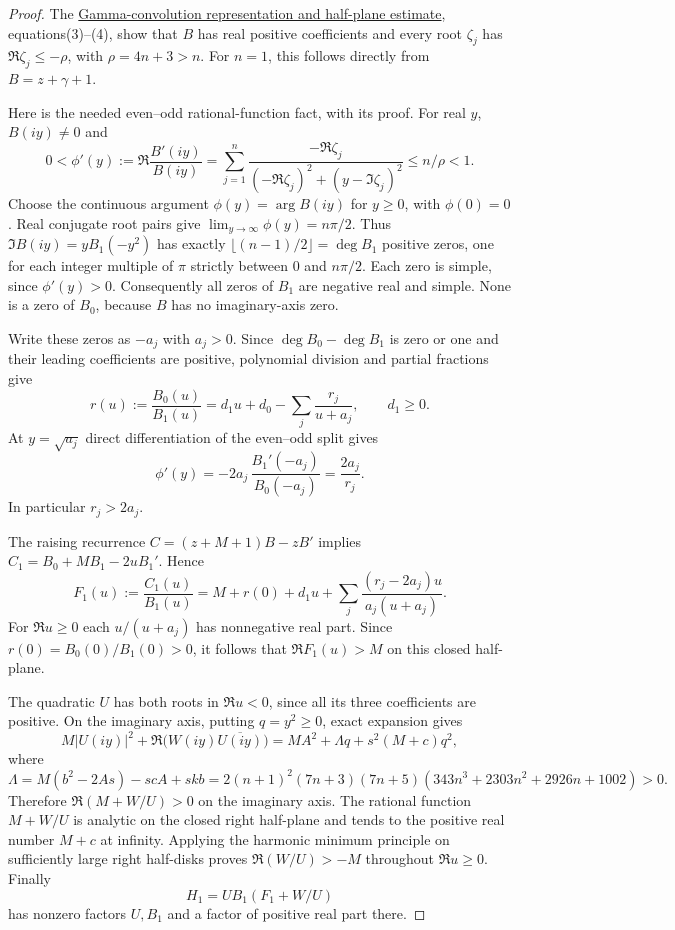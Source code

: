 \documentclass[11pt]{article}
\begin{document}
\begin{proof}
The \href{CUBIC_ADJOINT_STABILITY_SFC.tex}{Gamma-convolution representation and half-plane estimate}, equations(3)--(4),
show that $B$ has real positive coefficients and every root
$\zeta_j$ has $\Re\zeta_j\le-\rho$, with $\rho=4n+3>n$.
For $n=1$, this follows directly from $B=z+\gamma+1$.

Here is the needed even--odd rational-function fact, with its proof.
For real $y$, $B(iy)\ne0$ and
\[
 0<\phi'(y):=\Re\frac{B'(iy)}{B(iy)}
   =\sum_{j=1}^n
      \frac{-\Re\zeta_j}{(-\Re\zeta_j)^2+
                     (y-\Im\zeta_j)^2}
 \le n/\rho<1.
\]
Choose the continuous argument $\phi(y)=\arg B(iy)$ for $y\ge0$,
with $\phi(0)=0$. Real conjugate root pairs give
$\lim_{y\to\infty}\phi(y)=n\pi/2$.
Thus $\Im B(iy)=yB_1(-y^2)$ has exactly
$\lfloor(n-1)/2\rfloor=\deg B_1$ positive zeros,
one for each integer multiple of $\pi$ strictly between $0$ and
$n\pi/2$. Each zero is simple, since $\phi'(y)>0$.
Consequently all zeros of $B_1$ are negative real and simple.
None is a zero of $B_0$, because $B$ has no imaginary-axis zero.

Write these zeros as $-a_j$ with $a_j>0$.
Since $\deg B_0-\deg B_1$ is zero or one and their leading
coefficients are positive, polynomial division and partial fractions give
\[
 r(u):=\frac{B_0(u)}{B_1(u)}
       =d_1u+d_0-\sum_j\frac{r_j}{u+a_j},\qquad d_1\ge0.
\]
At $y=\sqrt{a_j}$ direct differentiation of the even--odd split gives
\[
 \phi'(y)=-2a_j\,\frac{B_1'(-a_j)}{B_0(-a_j)}
             =\frac{2a_j}{r_j}.
\]
In particular $r_j>2a_j$.

The raising recurrence $C=(z+M+1)B-zB'$ implies
$C_1=B_0+MB_1-2uB_1'$. Hence
\[
 F_1(u):=\frac{C_1(u)}{B_1(u)}
 =M+r(0)+d_1u+
     \sum_j\frac{(r_j-2a_j)u}{a_j(u+a_j)} .
\]
For $\Re u\ge0$ each $u/(u+a_j)$ has nonnegative real part.
Since $r(0)=B_0(0)/B_1(0)>0$, it follows that
$\Re F_1(u)>M$ on this closed half-plane.

The quadratic $U$ has both roots in $\Re u<0$, since all its
three coefficients are positive. On the imaginary axis, putting
$q=y^2\ge0$, exact expansion gives
\[
 M|U(iy)|^2+\Re\bigl(W(iy)\overline{U(iy)}\bigr)
 =MA^2+\Lambda q+s^2(M+c)q^2,
\]
where
\[
 \Lambda=M(b^2-2As)-scA+skb
 =2(n+1)^2(7n+3)(7n+5)
       (343n^3+2303n^2+2926n+1002)>0.
\]
Therefore $\Re(M+W/U)>0$ on the imaginary axis.
The rational function $M+W/U$ is analytic on the closed right
half-plane and tends to the positive real number $M+c$ at infinity.
Applying the harmonic minimum principle on sufficiently large right
half-disks proves $\Re(W/U)>-M$ throughout $\Re u\ge0$.
Finally
\[
 H_1=UB_1(F_1+W/U)
\]
has nonzero factors $U,B_1$ and a factor of positive real part there.
\end{proof}
\end{document}
